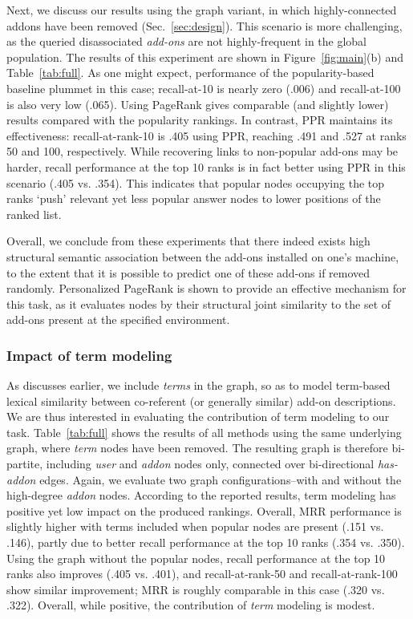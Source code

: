 \documentclass[11pt,oneside]{book}
\let\Oldsubsubsection\subsubsection
\renewcommand{\subsubsection}{\FloatBarrier\Oldsubsubsection}
\begin{document}
Next, we discuss our results using the graph variant, in which highly-connected addons have been removed (Sec.~\ref{sec:design}). This scenario is more challenging, as the queried disassociated {\it add-ons} are not highly-frequent in the global population. The results of this experiment are shown in Figure~\ref{fig:main}(b) and Table~\ref{tab:full}. As one might expect, performance of the popularity-based baseline plummet in this case; recall-at-10 is nearly zero (.006) and recall-at-100 is also very low (.065). Using PageRank gives comparable (and slightly lower) results compared with the popularity rankings. In contrast, PPR maintains its effectiveness: recall-at-rank-10 is .405 using PPR, reaching .491 and .527 at ranks 50 and 100, respectively. While recovering links to non-popular add-ons may be harder, recall performance at the top 10 ranks is in fact better using PPR in this scenario (.405 vs. .354). This indicates that popular nodes occupying the top ranks `push' relevant yet less popular answer nodes to lower positions of the ranked list.  

Overall, we conclude from these experiments that there indeed exists high structural semantic association between the add-ons installed on one's machine, to the extent that it is possible to predict one of these add-ons if removed randomly. Personalized PageRank is shown to provide an effective mechanism for this task, as it evaluates nodes by their structural joint similarity to the set of add-ons present at the specified environment. 

\subsubsection{Impact of term modeling}

As discusses earlier, we include {\it terms} in the graph, so as to model term-based lexical similarity between co-referent (or generally similar) add-on descriptions. We are thus interested in evaluating the contribution of term modeling to our task. Table~\ref{tab:full} shows the results of all methods using the same underlying graph, where {\it term} nodes have been removed. The resulting graph is therefore bi-partite, including {\it user} and {\it addon} nodes only, connected over bi-directional {\it has-addon} edges. Again, we evaluate two graph configurations--with and without the high-degree {\it addon} nodes. According to the reported results, term modeling has positive yet low impact on the produced rankings. Overall, MRR performance is slightly higher with terms included when popular nodes are present (.151 vs. .146), partly due to better recall  performance at the top 10 ranks (.354 vs. .350). Using the graph without the popular nodes, recall performance at the top 10 ranks also improves (.405 vs. .401), and recall-at-rank-50 and recall-at-rank-100 show similar improvement; MRR is roughly comparable in this case (.320 vs. .322). Overall, while positive, the contribution of {\it term} modeling is modest. 
\end{document}
